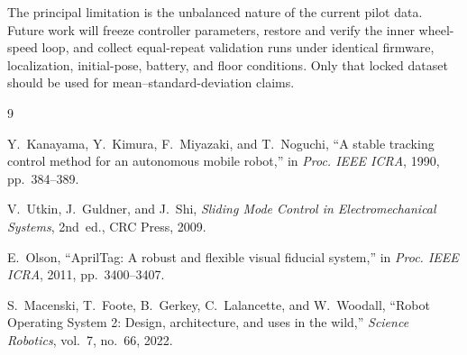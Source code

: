 \documentclass[conference]{IEEEtran}
\begin{document}
The principal limitation is the unbalanced nature of the current pilot data.
Future work will freeze controller parameters, restore and verify the inner
wheel-speed loop, and collect equal-repeat validation runs under identical
firmware, localization, initial-pose, battery, and floor conditions. Only
that locked dataset should be used for mean--standard-deviation claims.

\begin{thebibliography}{9}

Y.~Kanayama, Y.~Kimura, F.~Miyazaki, and T.~Noguchi,
``A stable tracking control method for an autonomous mobile robot,''
in \textit{Proc. IEEE ICRA}, 1990, pp.~384--389.

V.~Utkin, J.~Guldner, and J.~Shi,
\textit{Sliding Mode Control in Electromechanical Systems}, 2nd~ed.,
CRC Press, 2009.

E.~Olson, ``AprilTag: A robust and flexible visual fiducial system,''
in \textit{Proc. IEEE ICRA}, 2011, pp.~3400--3407.

S.~Macenski, T.~Foote, B.~Gerkey, C.~Lalancette, and W.~Woodall,
``Robot Operating System 2: Design, architecture, and uses in the wild,''
\textit{Science Robotics}, vol.~7, no.~66, 2022.

\end{thebibliography}
\end{document}
